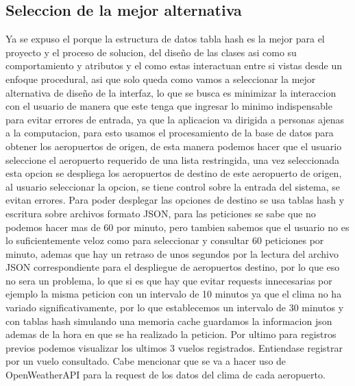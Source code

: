 \documentclass[12pt]{article}
\begin{document}
\subsection{Seleccion de la mejor alternativa}
Ya se expuso el porque la estructura de datos tabla hash es la mejor para el proyecto y el proceso de solucion, del diseño de las clases asi como su comportamiento y atributos y el como estas interactuan entre si vistas desde un enfoque procedural, asi que solo queda como vamos a seleccionar la mejor alternativa de diseño de la interfaz, lo que se busca es minimizar la interaccion con el usuario de manera que este tenga que ingresar lo minimo indispensable para evitar errores de entrada, ya que la aplicacion va dirigida a personas ajenas a la computacion, para esto usamos el procesamiento de la base de datos para obtener los aeropuertos de origen, de esta manera podemos hacer que el usuario seleccione el aeropuerto requerido de una lista restringida, una vez seleccionada esta opcion se despliega los aeropuertos de destino de este aeropuerto de origen, al usuario seleccionar la opcion, se tiene control sobre la entrada del sistema, se evitan errores. Para poder desplegar las opciones de destino se usa tablas hash y escritura sobre archivos formato JSON, para las peticiones se sabe que no podemos hacer mas de 60 por minuto, pero tambien sabemos que el usuario no es lo suficientemente veloz como para seleccionar y consultar 60 peticiones por minuto, ademas que hay un retraso de unos segundos por la lectura del archivo JSON correspondiente para el despliegue de aeropuertos destino, por lo que eso no sera un problema, lo que si es que hay que evitar requests innecesarias por ejemplo la misma peticion con un intervalo de 10 minutos ya que el clima no ha variado significativamente, por lo que establecemos un intervalo de 30 minutos y con tablas hash simulando una memoria cache guardamos la informacion json ademas de la hora en que se ha realizado la peticion. Por ultimo para registros previos podemos visualizar los ultimos 3 vuelos registrados. Entiendase registrar por un vuelo consultado. Cabe mencionar que se va a hacer uso de OpenWeatherAPI para la request de los datos del clima de cada aeropuerto.
\end{document}
